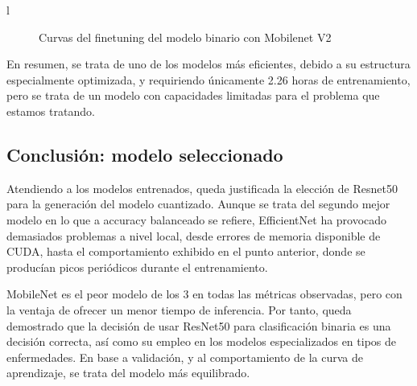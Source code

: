 l\begin{figure}[H]
	\centering
	\caption{Curvas del finetuning del modelo binario con Mobilenet V2}
	\label{fig:curvasmbin}
\end{figure}

En resumen, se trata de uno de los modelos más eficientes,    debido a su estructura especialmente optimizada, y requiriendo únicamente 2.26 horas de entrenamiento, pero se trata de un modelo con capacidades limitadas para el problema que estamos tratando.

\subsection{Conclusión: modelo seleccionado}

Atendiendo a los modelos entrenados, queda justificada la elección de Resnet50 para la generación del modelo cuantizado. Aunque se trata del segundo mejor modelo en lo que a accuracy balanceado se refiere, EfficientNet ha provocado demasiados problemas a nivel local, desde errores de memoria disponible de CUDA, hasta el comportamiento exhibido en el punto anterior, donde se producían picos periódicos durante el entrenamiento.

MobileNet es el peor modelo de los 3 en todas las métricas observadas, pero con la ventaja de ofrecer un menor tiempo de inferencia. Por tanto, queda demostrado que la decisión de usar ResNet50 para clasificación binaria es una decisión correcta, así como su empleo en los modelos especializados en tipos de enfermedades. En base a validación, y al comportamiento de la curva de aprendizaje, se trata del modelo más equilibrado.

